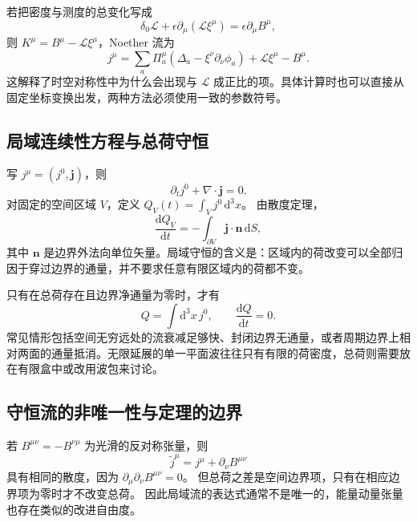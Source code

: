 若把密度与测度的总变化写成
\begin{equation}
  \delta_{0}\mathcal{L}
  +\epsilon\partial_{\mu}(\mathcal{L}\xi^{\mu})
  =\epsilon\partial_{\mu}B^{\mu},
\end{equation}
则 $K^{\mu}=B^{\mu}-\mathcal{L}\xi^{\mu}$，Noether 流为
\begin{equation}
  j^{\mu}=\sum_{a}\Pi_{a}^{\mu}
  \left(\Delta_{a}-\xi^{\nu}\partial_{\nu}\phi_{a}\right)
  +\mathcal{L}\xi^{\mu}-B^{\mu}.
\end{equation}
这解释了时空对称性中为什么会出现与 $\mathcal{L}$ 成正比的项。具体计算时也可以直接从固定坐标变换出发，两种方法必须使用一致的参数符号。

\subsection{局域连续性方程与总荷守恒}

写 $j^{\mu}=(j^{0},\bm{j})$，则
\begin{equation}
  \partial_{t}j^{0}+\nabla\cdot\bm{j}=0.
\end{equation}
对固定的空间区域 $V$，定义 $Q_{V}(t)=\int_{V}j^{0}\,\mathrm{d}^{3}x$。
由散度定理，
\begin{equation}
  \frac{\mathrm{d}Q_{V}}{\mathrm{d}t}
  =-\int_{\partial V}\bm{j}\cdot\bm{n}\,\mathrm{d}S,
  \label{eq:prelude-flux-law}
\end{equation}
其中 $\bm{n}$ 是边界外法向单位矢量。局域守恒的含义是：区域内的荷改变可以全部归因于穿过边界的通量，并不要求任意有限区域内的荷都不变。

只有在总荷存在且边界净通量为零时，才有
\begin{equation}
  Q=\int\mathrm{d}^{3}x\,j^{0},\qquad \frac{\mathrm{d}Q}{\mathrm{d}t}=0.
\end{equation}
常见情形包括空间无穷远处的流衰减足够快、封闭边界无通量，或者周期边界上相对两面的通量抵消。无限延展的单一平面波往往只有有限的荷密度，总荷则需要放在有限盒中或改用波包来讨论。

\subsection{守恒流的非唯一性与定理的边界}

若 $B^{\mu\nu}=-B^{\nu\mu}$ 为光滑的反对称张量，则
\begin{equation}
  \widetilde j^{\mu}=j^{\mu}+\partial_{\nu}B^{\mu\nu}
\end{equation}
具有相同的散度，因为 $\partial_{\mu}\partial_{\nu}B^{\mu\nu}=0$。
但总荷之差是空间边界项，只有在相应边界项为零时才不改变总荷。
因此局域流的表达式通常不是唯一的，能量动量张量也存在类似的改进自由度。

